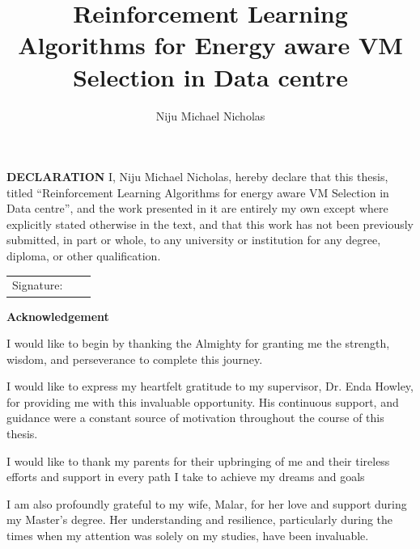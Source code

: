 \documentclass[a4paper,12pt]{Classes/RoboticsLaTeX}
\title{\Large{Reinforcement Learning Algorithms for Energy aware VM Selection in Data centre}}
\author{Niju Michael Nicholas}
\begin{document}
	\begin{spacing}{1}
		\maketitle
	\end{spacing}
	
	\newpage\null\thispagestyle{empty}\newpage
	
	\setcounter{secnumdepth}{3}
	\setcounter{tocdepth}{3}
	
	\frontmatter
	
	\textbf{DECLARATION} 
	I, Niju Michael Nicholas, hereby declare that this thesis, titled ``Reinforcement Learning Algorithms for energy aware VM Selection in Data centre'', and the work presented in it are entirely my own except where explicitly stated otherwise in the text, and that this work has not been previously submitted, in part or whole, to any university or institution for any degree, diploma, or other qualification. 
	\newline
	
	\begin{tabular}{@{}p{.5in}p{4in}@{}}
		Signature: & ~~\hrulefill \\
	\end{tabular}
	\newpage
	
	
	\textbf{Acknowledgement}

         I would like to begin by thanking the Almighty for granting me the strength, wisdom, and perseverance to complete this journey.
         
         I would like to express my heartfelt gratitude to my supervisor, Dr. Enda Howley, for providing me with this invaluable opportunity. His continuous support, and guidance were a constant source of motivation throughout the course of this thesis.

         I would like to thank my parents for their upbringing of me and their tireless efforts and support in every path I take to achieve my dreams and goals
         
        I am also profoundly grateful to my wife, Malar, for her love and support during my Master's degree. Her understanding and resilience, particularly during the times when my attention was solely on my studies, have been invaluable.
\end{document}

